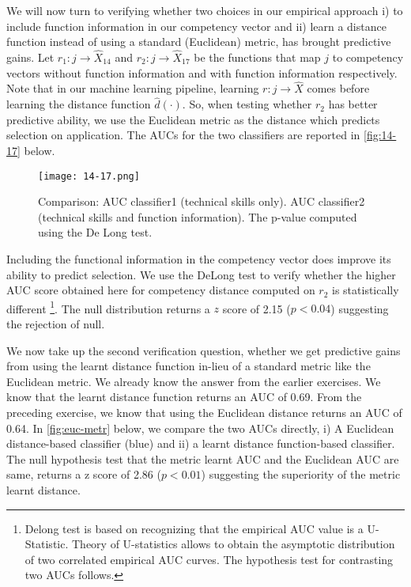 \documentclass{article}
\begin{document}
We will now turn to verifying whether two choices in our empirical approach i) to include function information in our competency vector and ii) learn a distance function instead of using a standard (Euclidean) metric, has brought predictive gains. Let \( r_1: j \rightarrow \hat{X}_{14} \) and \( r_2: j \rightarrow \hat{X}_{17} \) be the functions that map \( j \) to competency vectors without function information and with function information respectively. Note that in our machine learning pipeline, learning \( r: j \rightarrow \hat{X} \) comes before learning the distance function \( \hat{d}(\cdot) \). So, when testing whether \( r_2 \) has better predictive ability, we use the Euclidean metric as the distance which predicts selection on application. The AUCs for the two classifiers are reported in \autoref{fig:14-17} below.




\begin{figure}[!ht]
    \centering
    \texttt{[image: 14-17.png]} %
    \caption{Comparison: AUC classifier1 (technical skills only). AUC classifier2 (technical skills and function information). The p-value computed using the De Long test.} %
    \label{fig:14-17} 
\end{figure}

Including the functional information in the competency vector does improve its ability to predict selection. We use the DeLong test \autocite{DeLong1988} to verify whether the higher AUC score obtained here for competency distance computed on $r_2$ is statistically different \footnote{Delong test is based on recognizing that the empirical AUC value is a U-Statistic. Theory of U-statistics allows to obtain the asymptotic distribution of two correlated empirical AUC curves. The hypothesis test for contrasting two AUCs follows.}. The null distribution returns a $z$ score of 2.15 ($p < 0.04$) suggesting the rejection of null. 


We now take up the second verification question, whether we get predictive gains from using the learnt distance function in-lieu of a standard metric like the Euclidean metric. We already know the answer from the earlier exercises. We know that the learnt distance function returns an AUC of 0.69. From the preceding exercise, we know that using the Euclidean distance returns an AUC of 0.64. In \autoref{fig:euc-metr} below, we compare the two AUCs directly, i) A Euclidean distance-based classifier (blue) and ii) a learnt distance function-based classifier. The null hypothesis test that the metric learnt AUC and the Euclidean AUC are same, returns a z score of 2.86 ($p < 0.01$) suggesting the superiority of the metric learnt distance.
\end{document}
